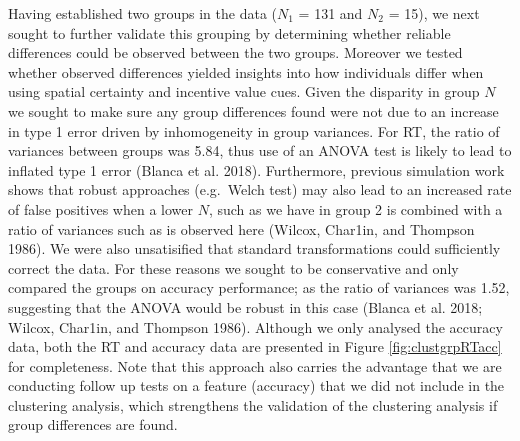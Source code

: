\documentclass[11pt,halfline,a4paper,]{ouparticle}
\begin{document}
Having established two groups in the data (\(N_{1}\) = 131 and \(N_{2}\) = 15), we next sought to further validate this grouping by determining whether reliable differences could be observed between the two groups. Moreover we tested whether observed differences yielded insights into how individuals differ when using spatial certainty and incentive value cues. Given the disparity in group \(N\) we sought to make sure any group differences found were not due to an increase in type 1 error driven by inhomogeneity in group variances. For RT, the ratio of variances between groups was 5.84, thus use of an ANOVA test is likely to lead to inflated type 1 error (Blanca et al. 2018). Furthermore, previous simulation work shows that robust approaches (e.g.~Welch test) may also lead to an increased rate of false positives when a lower \(N\), such as we have in group 2 is combined with a ratio of variances such as is observed here (Wilcox, Char1in, and Thompson 1986). We were also unsatisified that standard transformations could sufficiently correct the data. For these reasons we sought to be conservative and only compared the groups on accuracy performance; as the ratio of variances was 1.52, suggesting that the ANOVA would be robust in this case (Blanca et al. 2018; Wilcox, Char1in, and Thompson 1986). Although we only analysed the accuracy data, both the RT and accuracy data are presented in Figure \ref{fig:clustgrpRTacc} for completeness. Note that this approach also carries the advantage that we are conducting follow up tests on a feature (accuracy) that we did not include in the clustering analysis, which strengthens the validation of the clustering analysis if group differences are found.
\end{document}
